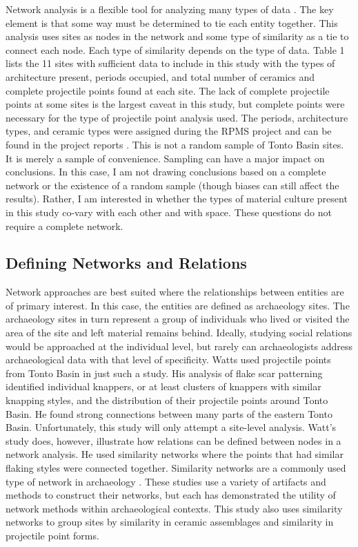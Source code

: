 \documentclass[]{interact}
\theoremstyle{plain}%
\theoremstyle{definition}
\theoremstyle{remark}
\begin{document}
Network analysis is a flexible tool for analyzing many types of data
\citep[see][]{Brughmans2023-uj}. The key element is that some way must
be determined to tie each entity together. This analysis uses sites as
nodes in the network and some type of similarity as a tie to connect
each node. Each type of similarity depends on the type of data. Table 1
lists the 11 sites with sufficient data to include in this study with
the types of architecture present, periods occupied, and total number of
ceramics and complete projectile points found at each site. The lack of
complete projectile points at some sites is the largest caveat in this
study, but complete points were necessary for the type of projectile
point analysis used. The periods, architecture types, and ceramic types
were assigned during the RPMS project and can be found in the project
reports \citep{Rice1998-ku}. This is not a random sample of Tonto Basin
sites. It is merely a sample of convenience. Sampling can have a major
impact on conclusions. In this case, I am not drawing conclusions based
on a complete network or the existence of a random sample (though biases
can still affect the results). Rather, I am interested in whether the
types of material culture present in this study co-vary with each other
and with space. These questions do not require a complete network.

\hypertarget{defining-networks-and-relations}{%
\subsection{Defining Networks and
Relations}\label{defining-networks-and-relations}}

Network approaches are best suited where the relationships between
entities are of primary interest. In this case, the entities are defined
as archaeology sites. The archaeology sites in turn represent a group of
individuals who lived or visited the area of the site and left material
remains behind. Ideally, studying social relations would be approached
at the individual level, but rarely can archaeologists address
archaeological data with that level of specificity. Watts
\citeyearpar{Watts2013-ub} used projectile points from Tonto Basin in
just such a study. His analysis of flake scar patterning identified
individual knappers, or at least clusters of knappers with similar
knapping styles, and the distribution of their projectile points around
Tonto Basin. He found strong connections between many parts of the
eastern Tonto Basin. Unfortunately, this study will only attempt a
site-level analysis. Watt's study does, however, illustrate how
relations can be defined between nodes in a network analysis. He used
similarity networks where the points that had similar flaking styles
were connected together. Similarity networks are a commonly used type of
network in archaeology
\citep[e.g.,][]{Birch2018-xx, Borck2015-jy, Cochrane2010-oa, Golitko2015-we, Lulewicz2019-lu, Mills2013-wq, Peeples2018-ib, Terrell2010-hd}.
These studies use a variety of artifacts and methods to construct their
networks, but each has demonstrated the utility of network methods
within archaeological contexts. This study also uses similarity networks
to group sites by similarity in ceramic assemblages and similarity in
projectile point forms.
\end{document}
